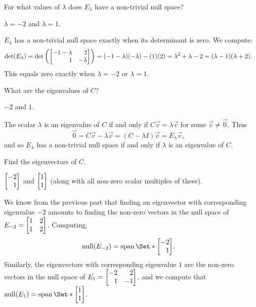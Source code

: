 \documentclass{problemset}
\begin{document}
	\begin{parts}
		\item For what values of $\lambda$ does $E_\lambda$ have a non-trivial
			null space?
			\begin{solution}
				$\lambda=-2$ and $\lambda=1$. 

				$E_\lambda$ has a non-trivial null space exactly when its 
				determinant is zero. We compute:
				\[
					\det(E_\lambda)
					=\det\left(\mat{-1-\lambda&2\\1&-\lambda}\right)
					=(-1-\lambda)(-\lambda)-(1)(2)
					=\lambda^2+\lambda-2
					=(\lambda-1)(\lambda+2).
				\]
				This equals zero exactly when $\lambda=-2$ or $\lambda=1$.
			\end{solution}
		\item What are the eigenvalues of $C$?
			\begin{solution}
				$-2$ and $1$.

				The scalar $\lambda$ is an eigenvalue of $C$ if and only if $C\vec v=\lambda \vec v$ for
				some $\vec v\neq \vec 0$. Thus
				\[
					\vec 0=C\vec v-\lambda \vec v=(C-\lambda I)\vec v=E_\lambda \vec v,
				\]
				and so $E_{\lambda}$ has a non-trivial null space if and only if $\lambda$ is
				an eigenvalue of $C$.
			\end{solution}
		\item Find the eigenvectors of $C$.
			\begin{solution}
				$\mat{-2\\1}$ and $\mat{1\\1}$ (along with all non-zero scalar
				multiples of these).

				We know from the previous part that finding an eigenvector with
				corresponding eigenvalue $-2$ amounts to finding the non-zero 
				vectors	in the null space of  
				$E_{-2}=\mat{1&2\\1&2}$. Computing,
				\[\Null(E_{-2})=\Span\Set*{\mat{-2\\1}}.\]
				Similarly, the eigenvectors with corresponding eigenvalue $1$ are
				the non-zero vectors in the null space of $E_1=\mat{-2&2\\1&-1}$, 
				and we compute that $\Null(E_1)=\Span\Set*{\mat{1\\1}}$.
			\end{solution}
	\end{parts}
\end{document}
